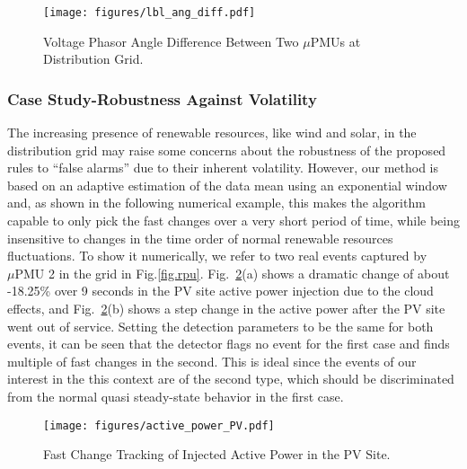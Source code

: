 \documentclass[twocolumn]{IEEEtran}
\newcommand{\mup}{\mu \text{PMU}}
\begin{document}
\begin{figure}[ht] 
\centering
\texttt{[image: figures/lbl\_ang\_diff.pdf]}\caption{Voltage Phasor Angle Difference Between Two $\mup$s at Distribution Grid.}
\label{fig.ang_diff}
\end{figure}  
\subsubsection{Case Study-Robustness Against Volatility}
The increasing presence of renewable resources, like wind and solar, in the distribution grid  may raise some concerns about the robustness of the proposed rules to ``false alarms'' due to their inherent volatility. However, our method is based on an adaptive estimation of the data mean using an exponential window and, as shown in the following numerical example, this makes the algorithm capable to only pick the fast changes over a very short period of time, while being insensitive to changes in the time order of normal renewable resources fluctuations. To show it numerically, we refer to two real events captured by $\mup$ 2 in the grid in Fig.\ref{fig.rpu}. Fig.~\ref{fig.active_power_PV}(a) shows a dramatic change of about -18.25\% over 9 seconds in the PV site active power injection due to the cloud effects, and Fig.~\ref{fig.active_power_PV}(b) shows a step change in the active power after the PV site went  out of service. Setting the detection parameters to be the same for both events, it can be seen that the detector flags no event for the first case and finds multiple of fast changes in the second. This is ideal since the events of our interest in the this context are of the second type, which should be discriminated from the normal quasi steady-state behavior in the first case.    
\begin{figure}[ht] 
\centering
    \texttt{[image: figures/active\_power\_PV.pdf]}
	\caption{Fast Change Tracking of Injected Active Power in the PV Site.}
    \label{fig.active_power_PV}
\end{figure}
\end{document}
